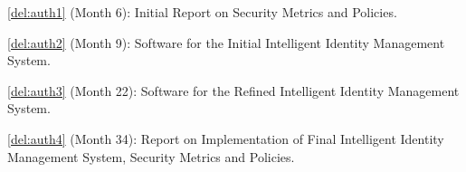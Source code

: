 \begin{Workpackage}{\thewpno}
\begin{WPDeliverables}
  \begin{compactitem}
\item \ref{del:auth1} (Month 6): Initial Report on Security Metrics and Policies.
\item \ref{del:auth2} (Month 9): Software for the Initial Intelligent Identity Management System.
\item \ref{del:auth3} (Month 22): Software for the Refined Intelligent Identity Management System.
\item \ref{del:auth4} (Month 34): Report on Implementation of Final Intelligent Identity Management System, Security Metrics and Policies.
\end{compactitem}
\end{WPDeliverables}
\end{Workpackage}
